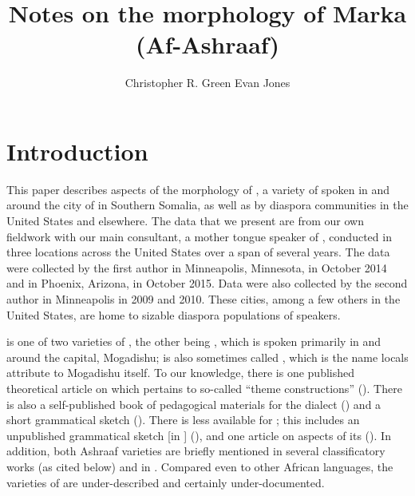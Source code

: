 \documentclass[output=paper,modfonts,nonflat,
colorlinks, citecolor=brown,
draftmode
]{langsci/langscibook}
\author{Christopher R. Green\affiliation{Syracuse University} 
\lastand Evan Jones\affiliation{University of Maryland}  
}
\title{Notes on the morphology of Marka (Af-Ashraaf)}
\begin{document}
\maketitle
\newcommand{\emphgj}[1]{\textit{#1}} %
\section{Introduction} 
 

 This paper describes aspects of the morphology of , a variety of  spoken in and around the city of  in Southern Somalia, as well as by diaspora communities in the United States and elsewhere. The data that we present are from our own fieldwork with our main consultant, a mother tongue speaker of , conducted in three locations across the United States over a span of several years. The data were collected by the first author in Minneapolis, Minnesota, in October 2014 and in Phoenix, Arizona, in October 2015. Data were also collected by the second author in Minneapolis in 2009 and 2010. These cities, among a few others in the United States, are home to sizable diaspora populations of  speakers. 
 
  is one of two varieties of , the other being , which is spoken primarily in and around the  capital, Mogadishu;  is also sometimes called , which is the name locals attribute to Mogadishu itself. To our knowledge, there is one published theoretical article on  which pertains to so-called ``{theme constructions}'' (\citealt{Ajello1984}). There is also a self-published book of pedagogical materials for the dialect (\citealt{Abo2007}) and a short grammatical sketch (\citealt{Moreno1953}). There is less available for ; this includes an unpublished grammatical sketch [in ] (\citealt{Lamberti1980}), and one article on aspects of its  (\citealt{Ajello1988}). In addition, both Ashraaf varieties are briefly mentioned in several classificatory works (as cited below) and in \citet{Banti2011}. Compared even to other African languages, the varieties of  are under-described and certainly under-documented.
 
\end{document}

